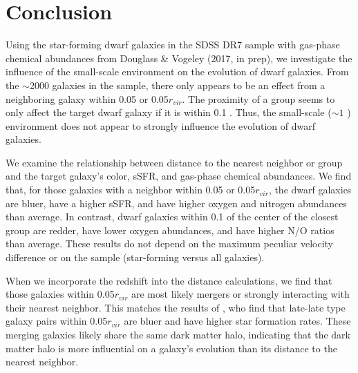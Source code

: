 

\section[Conclusion]{Conclusion}

Using the star-forming dwarf galaxies in the SDSS DR7 sample with gas-phase 
chemical abundances from Douglass \& Vogeley (2017, in prep), we investigate the 
influence of the small-scale environment on the evolution of dwarf galaxies.  
From the $\sim$2000 galaxies in the sample, there only appears to be an effect 
from a neighboring galaxy within 0.05 \hMpc or 0.05$r_{vir}$.  The proximity of 
a group seems to only affect the target dwarf galaxy if it is within 0.1 \hMpc.  
Thus, the small-scale ($\sim 1$ \hMpc) environment does not appear to strongly 
influence the evolution of dwarf galaxies.

We examine the relationship between distance to the nearest neighbor or group 
and the target galaxy's color, sSFR, and gas-phase chemical abundances.  We find 
that, for those galaxies with a neighbor within 0.05 \hMpc or 0.05$r_{vir}$, the 
dwarf galaxies are bluer, have a higher sSFR, and have higher oxygen and 
nitrogen abundances than average.  In contrast, dwarf galaxies within 0.1 \hMpc 
of the center of the closest group are redder, have lower oxygen abundances, and 
have higher N/O ratios than average.  These results do not depend on the maximum 
peculiar velocity difference or on the sample (star-forming versus all 
galaxies).

When we incorporate the redshift into the distance calculations, we find that 
those galaxies within 0.05$r_{vir}$ are most likely mergers or strongly 
interacting with their nearest neighbor.  This matches the results of 
\cite{Park09}, who find that late-late type galaxy pairs within 0.05$r_{vir}$ 
are bluer and have higher star formation rates.  These merging galaxies likely 
share the same dark matter halo, indicating that the dark matter halo is more 
influential on a galaxy's evolution than its distance to the nearest neighbor.  
